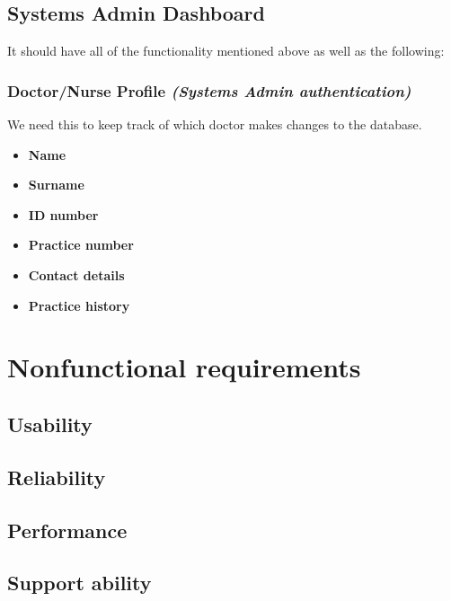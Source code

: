 \documentclass[a4paper]{article}
\begin{document}
\subsection{Systems Admin Dashboard}

It should have all of the functionality mentioned above as well as the following:

\subsubsection{Doctor/Nurse Profile \emph{(Systems Admin authentication)}}

We need this to keep track of which doctor makes changes to the database.

\begin{itemize}

\item \textbf{Name}

\item \textbf{Surname}

\item \textbf{ID number}

\item \textbf{Practice number}

\item \textbf{Contact details}

\item \textbf{Practice history}

\end{itemize}

\section{Nonfunctional requirements}

\subsection{Usability}

\subsection{Reliability}

\subsection{Performance}

\subsection{Support ability}
\end{document}

